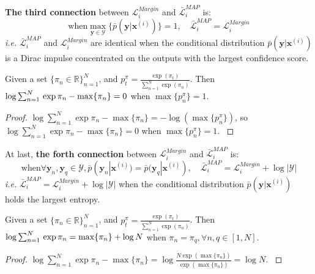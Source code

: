 \textbf{The third connection} between $\mathcal{L}^{Margin}_i$ and $\bar{\mathcal{L}}^{MAP}_i$ is: 
\begin{equation}
    \text{when} \max_{\mathbf{y}\in\mathcal{Y}}\{\bar{p}(\mathbf{y}|\mathbf{x}^{(i)})\}= 1, \quad \bar{\mathcal{L}}_i^{MAP}=\mathcal{L}^{Margin}_i 
    \label{equ:tight}
\end{equation}
\emph{i.e.} $\bar{\mathcal{L}}_i^{MAP}$ and $\mathcal{L}^{Margin}_i$ are identical when the conditional distribution $\bar{p}(\mathbf{y}|\mathbf{x}^{(i)})$ is a Dirac impulse concentrated on 
the outputs with the largest confidence score. 
\begin{proposition}
    Given a set $\{\pi_n\in\mathbb{R}\}_{n=1}^N$, and $p_t^\pi=\frac{\exp(\pi_t)}{\sum_{n=1}^N\exp(\pi_n)}$. Then $\log\sum_{n=1}^N\\\exp\pi_n-\max\{\pi_n\}=0$ when $\max\{p^\pi_n\}=1$.     
    \label{pro:bound}
\end{proposition}

\begin{proof}  
    $\log\sum_{n=1}^N\exp\pi_n-\max\{\pi_n\}=-\log (\max\{p^\pi_n\})$, so $\log\sum_{n=1}^N 
    \exp\pi_n-\max\{\pi_n\}=0$ when $\max\{p^\pi_n\}=1$.    
    \label{proof:bound}
\end{proof}

At last, \textbf{the forth connection} between $\mathcal{L}^{Margin}_i$ and $\bar{\mathcal{L}}^{MAP}_i$ is: 
\begin{equation}
    \text{when} \forall \mathbf{y}_n,\mathbf{y}_q\in\mathcal{Y}, \bar{p}(\mathbf{y}_n|\mathbf{x}^{(i)})= \bar{p}(\mathbf{y}_q|\mathbf{x}^{(i)}), \quad \bar{\mathcal{L}}_i^{MAP}=\mathcal{L}^{Margin}_i+\log|\mathcal{Y}|  
    \label{equ:upper_bound}
\end{equation}
\emph{i.e.} $\bar{\mathcal{L}}_i^{MAP}=\mathcal{L}^{Margin}_i+\log|\mathcal{Y}|$ when the conditional distribution $\bar{p}(\mathbf{y}|\mathbf{x}^{(i)})$ holds the largest entropy.    
\begin{proposition}
    Given a set $\{\pi_n\in\mathbb{R}\}_{n=1}^N$, and $p_t^\pi=\frac{\exp(\pi_t)}{\sum_{n=1}^N\exp(\pi_n)}$. Then 
    $\log\sum_{n=1}^N\\ \exp\pi_n=\max\{\pi_n\}+\log N$ when $\pi_n=\pi_q, \forall n,q \in [1,N]$.  
    \label{pro:up_bound}
\end{proposition}
\begin{proof}  
    $\log\sum_{n=1}^N\exp\pi_n-\max\{\pi_n\}=\log\frac{N\exp(\max\{\pi_n\})}{\exp(\max\{\pi_n\})}=\log N$.    
    \label{proof:up_bound}
\end{proof}
 
